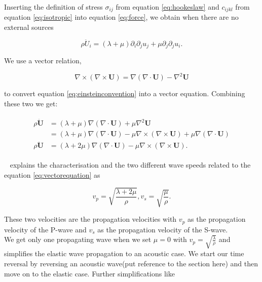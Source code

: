 Inserting the definition of stress $\sigma_{ij}$ from equation \ref{eq:hookeslaw} and $c_{ijkl}$ from equation \ref{eq:isotropic} into equation \ref{eq:force},
we obtain when there are no external sources

\begin{equation}
    \rho \ddot{U}_i = \left(\lambda + \mu \right)\partial_i \partial_j u_j + \mu \partial_j \partial_j u_i.
    \label{eq:einsteinconvention}
\end{equation}

We use a vector relation,

\begin{equation}
    \nabla \times \left(\nabla \times \mathbf{U}\right) = \nabla\left(\nabla \cdot \mathbf{U}\right) - \nabla^2 \mathbf{U}
\end{equation}

to convert equation \ref{eq:einsteinconvention} into a vector equation. Combining these two we get:

\begin{align}
    \begin{split}
        \rho \ddot{\mathbf{U}} &= \left(\lambda + \mu\right)\nabla\left(\nabla\cdot\mathbf{U}\right) + \mu \nabla^2 \mathbf{U} \\
        &= \left(\lambda + \mu\right)\nabla\left(\nabla \cdot \mathbf{U}\right) - \mu \nabla \times \left(\nabla \times \mathbf{U}\right) + \mu \nabla\left(\nabla \cdot \mathbf{U}\right) \\
        \rho \ddot{\mathbf{U}} &= \left(\lambda + 2\mu\right)\nabla\left(\nabla\cdot\mathbf{U}\right) - \mu \nabla\times\left(\nabla\times\mathbf{U}\right). 
    \end{split}
    \label{eq:vectorequation}
\end{align}

~\Parencite[Sec. 2.1]{kaufman} explains the characterisation and the two different wave speeds related to the equation \ref{eq:vectorequation} as

\begin{equation}
    v_p = \sqrt{\frac{\lambda + 2\mu}{\rho}}, v_s = \sqrt{\frac{\mu}{\rho}}.
\end{equation}

These two velocities are the propagation velocities with $v_p$ as the propagation velocity of the P-wave and $v_s$ as the propagation velocity of the S-wave. \\

We get only one propagating wave when we set $\mu = 0$ with $v_p = \sqrt{\frac{\lambda}{\rho}}$ and simplifies the elastic wave propagation to an acoustic case.
We start our time reversal by reversing an acoustic wave(put reference to the section here) and then move on to the elastic case. Further simplifications like 

